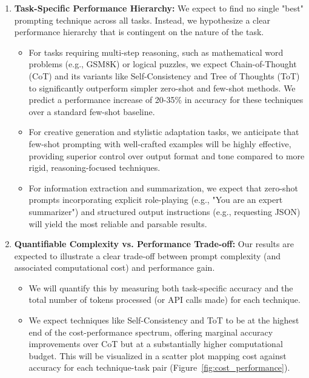 \documentclass{article}
\begin{document}
\begin{enumerate}
    \item \textbf{Task-Specific Performance Hierarchy:} We expect to find no single "best" prompting technique across all tasks. Instead, we hypothesize a clear performance hierarchy that is contingent on the nature of the task.
    \begin{itemize}
        \item For tasks requiring multi-step reasoning, such as mathematical word problems (e.g., GSM8K) or logical puzzles, we expect Chain-of-Thought (CoT) and its variants like Self-Consistency and Tree of Thoughts (ToT) to significantly outperform simpler zero-shot and few-shot methods. We predict a performance increase of 20-35\% in accuracy for these techniques over a standard few-shot baseline.
        \item For creative generation and stylistic adaptation tasks, we anticipate that few-shot prompting with well-crafted examples will be highly effective, providing superior control over output format and tone compared to more rigid, reasoning-focused techniques.
        \item For information extraction and summarization, we expect that zero-shot prompts incorporating explicit role-playing (e.g., "You are an expert summarizer") and structured output instructions (e.g., requesting JSON) will yield the most reliable and parsable results.
    \end{itemize}

    \item \textbf{Quantifiable Complexity vs. Performance Trade-off:} Our results are expected to illustrate a clear trade-off between prompt complexity (and associated computational cost) and performance gain. 
    \begin{itemize}
        \item We will quantify this by measuring both task-specific accuracy and the total number of tokens processed (or API calls made) for each technique. 
        \item We expect techniques like Self-Consistency and ToT to be at the highest end of the cost-performance spectrum, offering marginal accuracy improvements over CoT but at a substantially higher computational budget. This will be visualized in a scatter plot mapping cost against accuracy for each technique-task pair (Figure~\ref{fig:cost_performance}).
    \end{itemize}


\end{enumerate}
\end{document}
